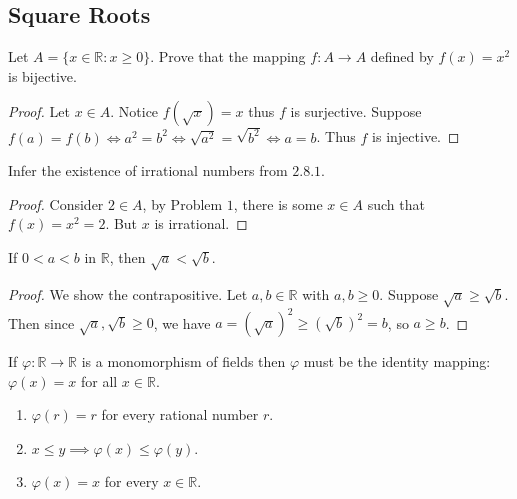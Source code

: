 \subsection{Square Roots}

\begin{tcolorbox}[title=Problem 1, breakable]
    Let $A = \{x \in \mathbb{R} : x \ge 0\}$.
    Prove that the mapping $f : A \longrightarrow A$
    defined by $f(x) = x^2$ is bijective.
\end{tcolorbox}

\begin{proof}
    Let $x \in A$.
    Notice $f(\sqrt{x}) = x$ thus $f$ is surjective.
    Suppose $f(a) = f(b) \iff a^2 = b^2 \iff \sqrt{a^2} = \sqrt{b^2} \iff a = b$.
    Thus $f$ is injective.
\end{proof}

\begin{tcolorbox}[title=Problem 2, breakable]
    Infer the existence of irrational numbers from $2.8.1$.
\end{tcolorbox}

\begin{proof}
    Consider $2 \in A$, by Problem $1$, there is some $x \in A$
    such that $f(x) = x^2 = 2$.
    But $x$ is irrational.
\end{proof}

\begin{tcolorbox}[title=Problem 3, breakable]
    If $0 < a < b$ in $\mathbb{R}$, then $\sqrt{a} < \sqrt{b}$.
\end{tcolorbox}

\begin{proof}
    We show the contrapositive.
    Let $a, b \in \mathbb{R}$ with $a, b \ge 0$.
    Suppose $\sqrt{a} \ge \sqrt{b}$. Then since $\sqrt{a}, \sqrt{b} \ge 0$,
    we have $a = (\sqrt{a})^2 \ge (\sqrt{b})^2 = b$, so $a \ge b$.
\end{proof}

\begin{tcolorbox}[title=Problem 6, breakable]
    If $\varphi : \mathbb{R} \to \mathbb{R}$ is a monomorphism of fields
    then $\varphi$ must be the identity mapping: $\varphi(x) = x$ for all
    $x \in \mathbb{R}$.
    \begin{enumerate}
        \item $\varphi(r) = r$ for every rational number $r$.
        \item $x \leq y \implies \varphi(x) \leq \varphi(y)$.
        \item $\varphi(x) = x$ for every $x \in \mathbb{R}$.
    \end{enumerate}
\end{tcolorbox}

